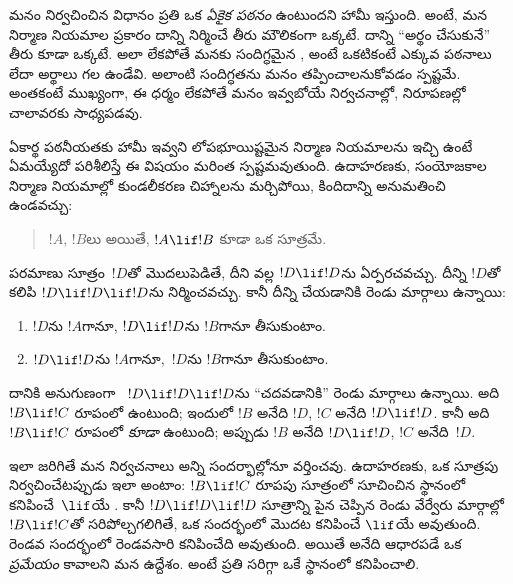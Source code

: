 \documentclass[../../../include/open-logic-section]{subfiles}
\begin{document}


\begin{explain}
మనం  నిర్వచించిన విధానం ప్రతి  ఒక
\emph{ఏకైక పఠనం} ఉంటుందని హామీ ఇస్తుంది. అంటే,  మన
నిర్మాణ నియమాల ప్రకారం దాన్ని నిర్మించే తీరు మౌలికంగా ఒక్కటే.
దాన్ని ``అర్థం చేసుకునే'' తీరు కూడా ఒక్కటే. అలా లేకపోతే మనకు
సందిగ్ధమైన , అంటే ఒకటికంటే ఎక్కువ పఠనాలు లేదా అర్థాలు గల
 ఉండేవి. అలాంటి సందిగ్ధతను మనం తప్పించాలనుకోవడం స్పష్టమే. అంతకంటే
ముఖ్యంగా, ఈ ధర్మం లేకపోతే మనం ఇవ్వబోయే నిర్వచనాల్లో, నిరూపణల్లో
చాలావరకు సాధ్యపడవు.

ఏకార్థ పఠనీయతకు హామీ ఇవ్వని లోపభూయిష్టమైన నిర్మాణ నియమాలను 
ఇచ్చి ఉంటే ఏమయ్యేదో పరిశీలిస్తే ఈ విషయం మరింత స్పష్టమవుతుంది. ఉదాహరణకు, సంయోజకాల నిర్మాణ నియమాల్లో కుండలీకరణ చిహ్నాలను
మర్చిపోయి, కిందిదాన్ని అనుమతించి ఉండవచ్చు:
\begin{quote}
$!A$, $!B$లు  అయితే, $!A \lif !B$ కూడా ఒక సూత్రమే.
\end{quote}
పరమాణు సూత్రం~$!D$తో మొదలుపెడితే, దీని వల్ల $!D \lif !D$ను
ఏర్పరచవచ్చు. దీన్ని $!D$తో కలిపి $!D \lif !D \lif !D$ను నిర్మించవచ్చు.
కానీ దీన్ని చేయడానికి రెండు మార్గాలు ఉన్నాయి:
\begin{enumerate}
\item $!D$ను $!A$గానూ, $!D \lif !D$ను $!B$గానూ తీసుకుంటాం.
\item $!D \lif !D$ను $!A$గానూ,~$!D$ను $!B$గానూ తీసుకుంటాం.
\end{enumerate}
దానికి అనుగుణంగా ~$!D \lif !D \lif !D$ను ``చదవడానికి''
రెండు మార్గాలు ఉన్నాయి. అది $!B \lif !C$ రూపంలో ఉంటుంది; ఇందులో
$!B$ అనేది $!D$, $!C$ అనేది $!D \lif !D$. కానీ అది $!B \lif !C$
రూపంలో \emph{కూడా} ఉంటుంది; అప్పుడు $!B$ అనేది $!D \lif !D$, $!C$
అనేది~$!D$.

ఇలా జరిగితే మన నిర్వచనాలు అన్ని సందర్భాల్లోనూ వర్తించవు. ఉదాహరణకు, ఒక సూత్రపు
 నిర్వచించేటప్పుడు ఇలా అంటాం: $!B \lif !C$ రూపపు
సూత్రంలో సూచించిన స్థానంలో కనిపించే~$\lif$యే . కానీ
$!D \lif !D \lif !D$ సూత్రాన్ని పైన చెప్పిన రెండు వేర్వేరు మార్గాల్లో
$!B \lif !C$తో సరిపోల్చగలిగితే, ఒక సందర్భంలో మొదట కనిపించే $\lif$యే
 అవుతుంది. రెండవ సందర్భంలో రెండవసారి కనిపించేది అవుతుంది.
అయితే  అనేది  ఆధారపడే ఒక \emph{ప్రమేయం} కావాలని
మన ఉద్దేశం. అంటే ప్రతి  సరిగ్గా ఒకే స్థానంలో 
కనిపించాలి.
\end{explain}
\end{document}
